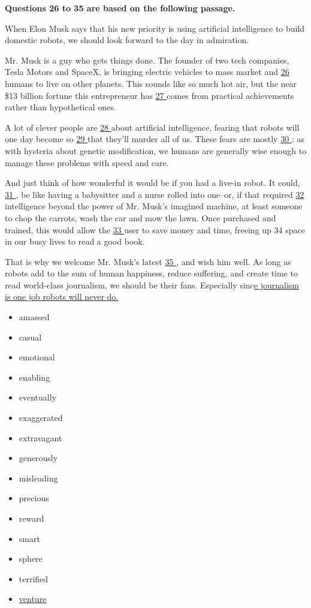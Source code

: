 \documentclass[UTF8,11pt]{ctexart}
\begin{document}
\textbf{Questions 26 to 35 are based on the following passage.}


When Elon Musk says that his new priority is using artificial intelligence to build domestic robots, we should look forward to the day in admiration.


Mr. Musk is a guy who gets things done. The founder of two tech companies, Tesla Motors and SpaceX, is bringing electric vehicles to mass market and \uline{26 }humans to live on other planets. This sounds like so much hot air, but the near \$13 billion fortune this entrepreneur has \uline{27 }comes from practical achievements rather than hypothetical ones.


A lot of clever people are \uline{28 }about artificial intelligence, fearing that robots will one day become so \uline{29 }that they’ll murder all of us. These fears are mostly \uline{30 }: as with hysteria about genetic modification, we humans are generally wise enough to manage these problems with speed and care.


And just think of how wonderful it would be if you had a live-in robot. It could, \uline{31 }, be like having a babysitter and a nurse rolled into one--or, if that required \uline{32 }intelligence beyond the power of Mr. Musk’s imagined machine, at least someone to chop the carrots, wash the car and mow the lawn. Once purchased and trained, this would allow the \uline{33 }user to save money and time, freeing up 34 space in our busy lives to read a good book.


That is why we welcome Mr. Musk’s latest \uline{35 }, and wish him well. As long as robots add to the sum of human happiness, reduce suffering, and create time to read world-class journalism, we should be their fans. Especially sinc\uline{e journalism is one job robots will never do.}


\begin{itemize}[leftmargin=2em,itemsep=.2em,topsep=.4em]\item[A.] amassed
\item[B.] casual
\item[C.] emotional
\item[D.] enabling
\item[E.] eventually
\item[F.] exaggerated
\item[G.] extravagant
\item[H.] generously
\item[I.] misleading
\item[J.] precious
\item[K.] reward
\item[L.] smart
\item[M.] sphere
\item[N.] terrified
\item[O.] \uline{venture}
\end{itemize}
\end{document}

